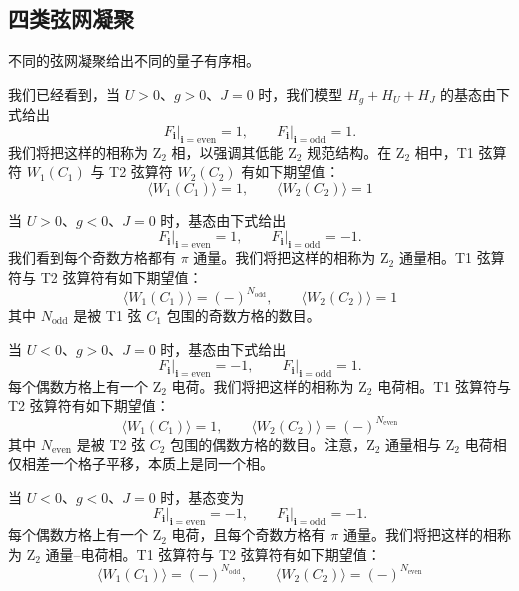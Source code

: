\subsection{四类弦网凝聚}

\begin{keypoints}\item 不同的弦网凝聚给出不同的量子有序相。\end{keypoints}

我们已经看到，当 $U>0$、$g>0$、$J=0$ 时，我们模型 $H_g+H_U+H_J$ 的基态由下式给出
\begin{equation*}
F_{\pmb{i}}\big|_{\pmb{i}=\mathrm{even}}=1,\qquad F_{\pmb{i}}\big|_{\pmb{i}=\mathrm{odd}}=1.
\end{equation*}
我们将把这样的相称为 Z$_2$ 相，以强调其低能 Z$_2$ 规范结构。在 Z$_2$ 相中，T1 弦算符 $W_1(C_1)$ 与 T2 弦算符 $W_2(C_2)$ 有如下期望值：
\begin{equation*}
\langle W_1(C_1)\rangle=1,\qquad \langle W_2(C_2)\rangle=1
\end{equation*}

当 $U>0$、$g<0$、$J=0$ 时，基态由下式给出
\begin{equation*}
F_{\pmb{i}}\big|_{\pmb{i}=\mathrm{even}}=1,\qquad F_{\pmb{i}}\big|_{\pmb{i}=\mathrm{odd}}=-1.
\end{equation*}
我们看到每个奇数方格都有 $\pi$ 通量。我们将把这样的相称为 Z$_2$ 通量相。T1 弦算符与 T2 弦算符有如下期望值：
\begin{equation*}
\langle W_1(C_1)\rangle=(-)^{N_{\mathrm{odd}}},\qquad \langle W_2(C_2)\rangle=1
\end{equation*}
其中 $N_{\mathrm{odd}}$ 是被 T1 弦 $C_1$ 包围的奇数方格的数目。

当 $U<0$、$g>0$、$J=0$ 时，基态由下式给出
\begin{equation*}
F_{\pmb{i}}\big|_{\pmb{i}=\mathrm{even}}=-1,\qquad F_{\pmb{i}}\big|_{\pmb{i}=\mathrm{odd}}=1.
\end{equation*}
每个偶数方格上有一个 Z$_2$ 电荷。我们将把这样的相称为 Z$_2$ 电荷相。T1 弦算符与 T2 弦算符有如下期望值：
\begin{equation*}
\langle W_1(C_1)\rangle=1,\qquad \langle W_2(C_2)\rangle=(-)^{N_{\mathrm{even}}}
\end{equation*}
其中 $N_{\mathrm{even}}$ 是被 T2 弦 $C_2$ 包围的偶数方格的数目。注意，Z$_2$ 通量相与 Z$_2$ 电荷相仅相差一个格子平移，本质上是同一个相。

当 $U<0$、$g<0$、$J=0$ 时，基态变为
\begin{equation*}
F_{\pmb{i}}\big|_{\pmb{i}=\mathrm{even}}=-1,\qquad F_{\pmb{i}}\big|_{\pmb{i}=\mathrm{odd}}=-1.
\end{equation*}
每个偶数方格上有一个 Z$_2$ 电荷，且每个奇数方格有 $\pi$ 通量。我们将把这样的相称为 Z$_2$ 通量--电荷相。T1 弦算符与 T2 弦算符有如下期望值：
\begin{equation*}
\langle W_1(C_1)\rangle=(-)^{N_{\mathrm{odd}}},\qquad \langle W_2(C_2)\rangle=(-)^{N_{\mathrm{even}}}
\end{equation*}


